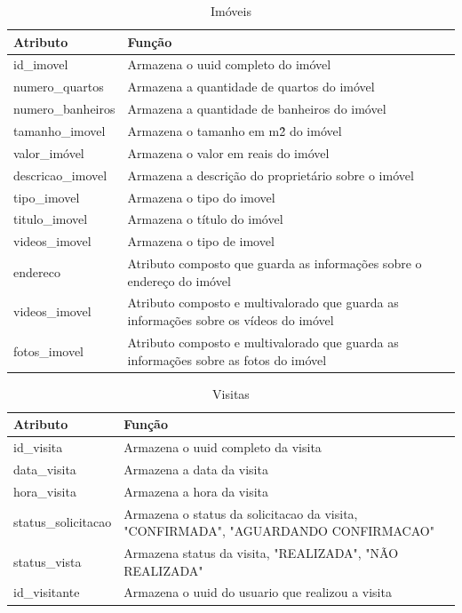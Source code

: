 \begin{table}[htbp]
    \centering
    \caption{Imóveis}
    \begin{tabular}{|p{5cm}|p{10cm}|} 
        \hline
        \textbf{Atributo} & \textbf{Função} \\
        \hline
        id\_imovel & Armazena o uuid completo do imóvel \\ 
        \hline
        numero\_quartos & Armazena a quantidade de quartos do imóvel \\ 
        \hline
        numero\_banheiros & Armazena a quantidade de banheiros do imóvel \\ 
        \hline
        tamanho\_imovel & Armazena o tamanho em m\^2 do imóvel \\ 
        \hline
        valor\_imóvel & Armazena o valor em reais do imóvel \\ 
        \hline
        descricao\_imovel & Armazena a descrição do proprietário sobre o imóvel \\ 
        \hline
        tipo\_imovel & Armazena o tipo do imovel \\ 
        \hline
        titulo\_imovel & Armazena o título do imóvel \\ 
        \hline
        videos\_imovel & Armazena o tipo de imovel \\ 
        \hline
        endereco & Atributo composto que guarda as informações sobre o endereço do imóvel \\ 
        \hline
        videos\_imovel & Atributo composto e multivalorado que guarda as informações sobre os vídeos do imóvel \\ 
        \hline
        fotos\_imovel & Atributo composto e multivalorado que guarda as informações sobre as fotos do imóvel \\ 
        \hline
    \end{tabular}
    \label{tab:usuarios}
\end{table}


\begin{table}[htbp]
    \centering
    \caption{Visitas}
    \begin{tabular}{|p{5cm}|p{10cm}|} 
        \hline
        \textbf{Atributo} & \textbf{Função} \\
        \hline
        id\_visita & Armazena o uuid completo da visita \\ 
        \hline
        data\_visita & Armazena a data da visita \\ 
        \hline
        hora\_visita & Armazena a hora da visita \\ 
        \hline status\_solicitacao & Armazena o status da solicitacao da visita, "CONFIRMADA", "AGUARDANDO CONFIRMACAO" \\ 
        \hline status\_vista & Armazena status da visita, "REALIZADA", "NÃO REALIZADA" \\ 
        \hline
        id\_visitante  & Armazena o uuid do usuario que realizou a visita \\ 
        \hline
        
    \end{tabular} 
    \label{tab:usuarios}
\end{table}

